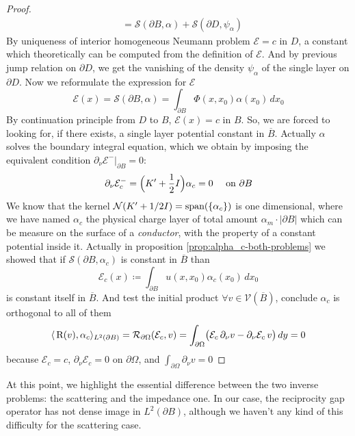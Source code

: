 \documentclass[10pt, a4paper, twoside, openright]{book}
\theoremstyle{definition}
\theoremstyle{plain}
\theoremstyle{plain}
\theoremstyle{plain}
\theoremstyle{plain}
\theoremstyle{plain}
\theoremstyle{plain}
\theoremstyle{plain}
\theoremstyle{plain}
\begin{document}
\begin{proof}
\begin{align}
  &=\mathcal{S}(\partial B, \alpha) + \mathcal{S}(\partial D, \psi_\alpha)
 \end{align}
 By uniqueness of interior homogeneous Neumann problem $\mathcal{E} = c$ in $D$, a constant which theoretically can be computed from the definition of $\mathcal{E}$. And by previous jump relation on $\partial D$, we get the vanishing of the density $\psi_\alpha$ of the single layer on $\partial D$. Now we reformulate the expression for $\mathcal{E}$
 \begin{equation}
  \mathcal{E}(x)= \mathcal{S}(\partial B, \alpha) = \int_{\partial B}\Phi(x,x_0)\alpha(x_0)\, dx_0
 \end{equation}
 By continuation principle from $D$ to $B$, $\mathcal{E}(x)=c$ in $B$. So, we are forced to looking for, if there exists, a single layer potential constant in $\overline{B}$. 
 Actually $\alpha$ solves the boundary integral equation, which we obtain by imposing the equivalent condition $\partial_\nu\mathcal{E}^-|_{\partial B}=0$:
 \begin{equation}
  \partial_\nu\mathcal{E}_{c}^-=\Bigl(K'+\dfrac{1}{2}I\Bigr)\alpha_{c}= 0\quad\textup{ on }\partial B
 \end{equation}
 We know that the kernel $\mathcal{N}(K' + 1/2 I)=\textup{span}(\{\alpha_{c}\})$ is one dimensional, where we have named $\alpha_{c}$ the physical charge layer of total amount $\alpha_m \cdot |\partial B|$  which can be measure on the surface of a \emph{conductor}, with the property of a constant potential inside it.
Actually in proposition \ref{prop:alpha_c-both-problems} we showed that if $\mathcal{S}(\partial B, \alpha_{c})$ is constant in $\overline{B}$ than
\begin{equation}
 \mathcal{E}_{c}(x)\coloneqq\int_{\partial B}u(x,x_0)\alpha_{c}(x_0)\,dx_0\label{eq:definition-E-pc}
\end{equation}
is constant itself in $\overline{B}$. And test the initial product $\forall v\in\mathcal{V}(\overline{B})$, conclude $\alpha_{c}$ is orthogonal to all of them
\begin{equation}
 \langle \, \textup{R}(v) ,\alpha_{c}\rangle_{L^2(\partial B)}=\mathcal{R}_{\partial \Omega}(\mathcal{E}_{c}, v)=\int_{\partial\Omega}\bigl(\mathcal{E}_{c}\,\partial_\nu v - \partial_\nu\mathcal{E}_{c}\, v\bigr)\,dy=0
\end{equation}
because $\mathcal{E}_{c}=c$, $\partial_\nu\mathcal{E}_{c}=0$ on $\partial\Omega$, and $\int_{\partial\Omega}\partial_\nu v=0$
\end{proof}
At this point, we highlight the essential difference between the two inverse problems: the scattering and the impedance one. In our case, the reciprocity gap operator has not dense image in $L^2(\partial B)$, although we haven't any kind of this difficulty for the scattering case.
\end{document}
